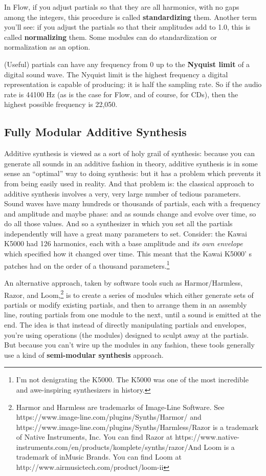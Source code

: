 \documentclass{article}
\newcommand\name{Flow}
\begin{document}
In {\name}, if you adjust partials so that they are all harmonics, with no gaps among the integers, this procedure is called {\bf standardizing} them.  Another term you'll see: if you adjust the partials so that their amplitudes add to 1.0, this is called {\bf normalizing} them.  Some modules can do standardization or normalization as an option.

(Useful) partials can have any frequency from 0 up to the {\bf Nyquist limit} of a digital sound wave.  The Nyquist limit is the highest frequency a digital representation is capable of producing: it is half the sampling rate.  So if the audio rate is 44100 Hz (as is the case for {\name}, and of course, for CDs), then the highest possible frequency is 22,050.

\subsection{Fully Modular Additive Synthesis}  Additive synthesis is viewed as a sort of holy grail of synthesis: because you can generate all sounds in an additive fashion in theory, additive synthesis is in some sense an ``optimal'' way to doing synthesis: but it has a problem which prevents it from being easily used in reality.   And that problem is: the classical approach to additive synthesis involves a very, very large number of tedious parameters.  Sound waves have many hundreds or thousands of partials, each with a frequency and amplitude and maybe phase: and as sounds change and evolve over time, so do all those values.  And so a synthesizer in which you set all the partials independently will have a great many parameters to set.  Consider: the Kawai K5000 had 126 harmonics, each with a base amplitude and {\it its own envelope} which specified how it changed over time.  This meant that the Kawai K5000' s patches had on the order of a thousand parameters.\footnote{I'm not denigrating the K5000.  The K5000 was one of the most incredible and awe-inspiring synthesizers in history.}

An alternative approach, taken by software tools such as Harmor/Harmless, Razor, and Loom,\footnote{Harmor and Harmless are trademarks of Image-Line Software.  See https:/\!/www.image-line.com/plugins/Synths/Harmor/  and https:/\!/www.image-line.com/plugins/Synths/Harmless/\qquad Razor is a trademark of Native Instruments, Inc.  You can find Razor at https:/\!/www.native-instruments.com/en/products/komplete/synths/razor/\qquad And Loom is a trademark of inMusic Brands.  You can find Loom at http:/\!/www.airmusictech.com/product/loom-ii}
is to create a series of modules which either generate sets of partials or modify existing partials, and then to arrange them in an assembly line, routing partials from one module to the next, until a sound is emitted at the end.  The idea is that instead of directly manipulating partials and envelopes, you're using operations (the modules) designed to sculpt away at the partials.  But because you can't wire up the modules in any fashion, these tools generally use a kind of {\bf semi-modular synthesis} approach.  
\end{document}
